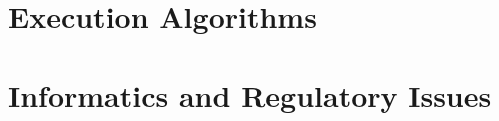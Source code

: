 \documentclass[krantz1,ChapterTOCs]{krantz} %
\theoremstyle{plain}
\theoremstyle{custom}
\theoremstyle{remark}
\numberwithin{equation}{chapter}
\begin{document}
\part{Execution Algorithms}





\part{Informatics and Regulatory Issues}


%


\end{document}
